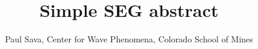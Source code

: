 

\author{Paul Sava, 
Center for Wave Phenomena, 
Colorado School of Mines}
\title{Simple SEG abstract}
\maketitle










